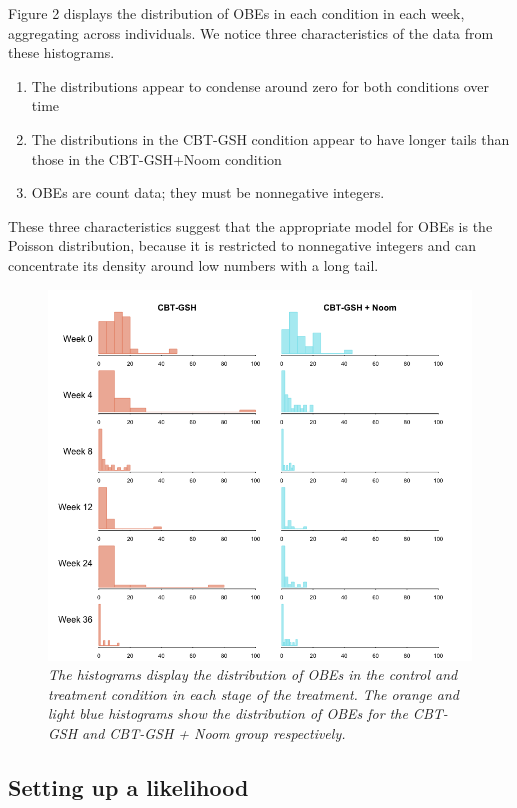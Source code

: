 \documentclass{article}
\begin{document}
Figure 2 displays the distribution of OBEs in each condition in each week, aggregating across individuals.  We notice three characteristics of the data from these histograms.
\begin{enumerate}
\item{The distributions appear to condense around zero for both conditions over time} 
\item{The distributions in the CBT-GSH condition appear to have longer tails than those in the CBT-GSH+Noom condition}
\item{OBEs are count data; they must be nonnegative integers.}
\end{enumerate}
These three characteristics suggest that the appropriate model for OBEs is the Poisson distribution, because it is restricted to nonnegative integers and can concentrate its density around low numbers with a long tail.
%
\begin{figure}[H]
\begin{center}
\includegraphics[width=\textwidth, height=\textheight, keepaspectratio]{noom_hist.png}
\end{center}
\caption{\emph{The histograms display the distribution of OBEs in the control and treatment condition in each stage of the treatment. The orange and light blue histograms show the distribution of OBEs for the CBT-GSH and CBT-GSH  + Noom group respectively.}}
\end{figure}
%
\subsection*{Setting up a likelihood}
\end{document}
